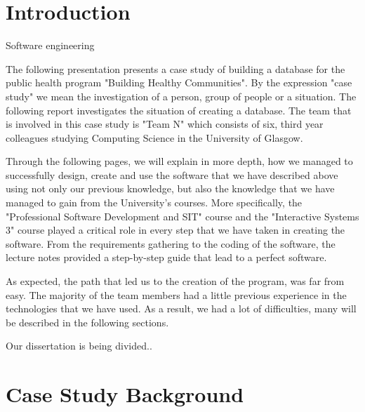 \documentclass{l3proj}
\begin{document}
\educationalconsent

\newpage

\section{Introduction}

Software engineering 



The following presentation presents a case study of building a database for the public health program "Building Healthy Communities". By the expression "case study" we mean the investigation of a person, group of people or a situation. The following report investigates the situation of creating a database. The team that is involved in this case study is "Team N" which consists of six, third year colleagues studying Computing Science in the University of Glasgow.

Through the following pages, we will explain in more depth, how we managed to successfully design, create and use the software that we have described above using not only our previous knowledge, but also the knowledge that we have managed to gain from the University's courses. More specifically, the "Professional Software Development and SIT" course and the "Interactive Systems 3" course played a critical role in every step that we have taken in creating the software. From the requirements gathering to the coding of the software, the lecture notes provided a step-by-step guide that lead to a perfect software.

As expected, the path that led us to the creation of the program, was far from easy. The majority of the team members had a little previous experience in the technologies that we have used. As a result, we had a lot of difficulties, many will be described in the following sections.


Our dissertation is being divided..

\section{Case Study Background}
\end{document}
